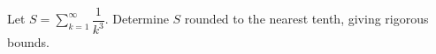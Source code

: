 Let $S=\sum_{k=1}^{\infty}\dfrac{1}{k^3}$. Determine $S$ rounded to the nearest tenth, giving rigorous bounds.

